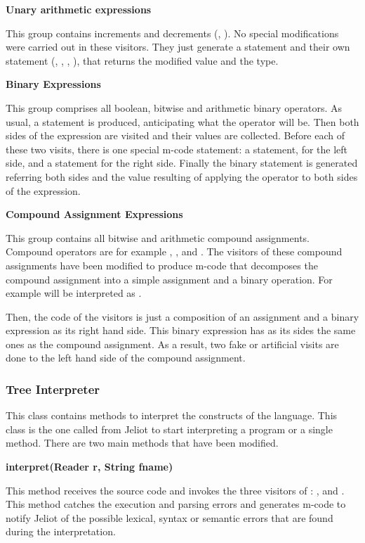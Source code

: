 {\bf{Unary arithmetic expressions}}

This group contains increments and decrements (\p{++}, \p{---}).
No special modifications were carried out in these visitors. They
just generate a  statement and their own statement
(, , , ), that returns the modified
value and the type.

{\bf{Binary Expressions}}

This group comprises all boolean, bitwise and arithmetic binary
operators. As usual, a  statement is produced,
anticipating what the operator will be. Then both sides of the
expression are visited and their values are collected. Before each
of these two visits, there is one special m-code statement: a
 statement, for the left side, and a  statement
for the right side. Finally the binary statement is generated
referring both sides and the value resulting of applying the
operator to both sides of the expression.

{\bf{Compound Assignment Expressions}}

This group contains all bitwise and arithmetic compound assignments.
Compound operators are for example \p{+=}, \p{-=}, \p{*=} and \p{/=}. The visitors of
these compound assignments have been modified to produce m-code that
decomposes the compound assignment into a simple assignment and a binary
operation. For example  will be interpreted as .

Then, the code of the visitors is just a composition of an
assignment and a binary expression as its right hand side. This
binary expression has as its sides the same ones as the compound
assignment. As a result, two fake or artificial visits are done to
the left hand side of the compound assignment.

\subsubsection{Tree Interpreter}

This class contains methods to interpret the constructs of the language.
This class is the one called from Jeliot to start interpreting a program
or a single method. There are two main methods that have been modified.

{\bf{interpret(Reader r, String fname)}}

This method receives the source code and invokes the three
visitors of \djava{}: ,  and
. This method catches the execution and
parsing errors and generates m-code to notify Jeliot of the
possible lexical, syntax or semantic errors that are found during
the interpretation.

